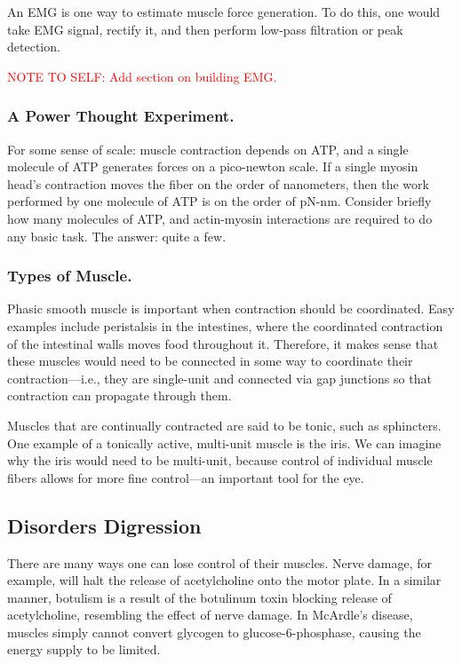 An EMG is one way to estimate muscle force generation. To do this, one would take EMG signal, rectify it, and then perform low-pass filtration or peak detection.\newline

\textcolor{red}{NOTE TO SELF: Add section on building EMG.}


\subsubsection{A Power Thought Experiment.}

For some sense of scale: muscle contraction depends on ATP, and a single molecule of ATP generates forces on a pico-newton scale. If a single myosin head's contraction moves the fiber on the order of nanometers, then the work performed by one molecule of ATP is on the order of pN-nm. Consider briefly how many molecules of ATP, and actin-myosin interactions are required to do any basic task. The answer: quite a few. 


\subsubsection{Types of Muscle.}

Phasic smooth muscle is important when contraction should be coordinated. Easy examples include peristalsis in the intestines, where the coordinated contraction of the intestinal walls moves food throughout it. Therefore, it makes sense that these muscles would need to be connected in some way to coordinate their contraction---i.e., they are single-unit and connected via gap junctions so that contraction can propagate through them.\newline

Muscles that are continually contracted are said to be tonic, such as sphincters. One example of a tonically active, multi-unit muscle is the iris. We can imagine why the iris would need to be multi-unit, because control of individual muscle fibers allows for more fine control---an important tool for the eye. 

\subsection{Disorders Digression}
There are many ways one can lose control of their muscles. Nerve damage, for example, will halt the release of acetylcholine onto the motor plate. In a similar manner, botulism is a result of the botulinum toxin blocking release of acetylcholine, resembling the effect of nerve damage. In McArdle's disease, muscles simply cannot convert glycogen to glucose-6-phosphase, causing the energy supply to be limited. 

